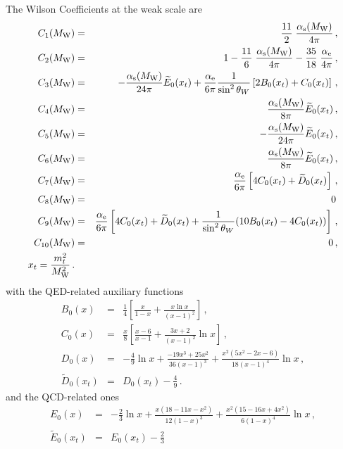 The Wilson Coefficients at the weak scale are
\begin{eqnarray}
C_1(M_{\mathrm W}) &=&     \frac{11}{2} \; \frac{\alpha_{\mathrm s}(M_{\mathrm W})}{4\pi} \, ,
\label{eq:CMw1} \\
C_2(M_{\mathrm W}) &=& 1 - \frac{11}{6} \; \frac{\alpha_{\mathrm s}(M_{\mathrm W})}{4\pi}
               - \frac{35}{18} \; \frac{\alpha_{\mathrm e}}{4\pi} \, ,
\label{eq:CMw2} \\
C_3(M_{\mathrm W}) &=& -\frac{\alpha_{\mathrm s}(M_{\mathrm W})}{24\pi} \widetilde{E}_0(x_t)
             +\frac{\alpha_{\mathrm e}}{6\pi} \frac{1}{\sin^2\theta_W}
             \left[ 2 B_0(x_t) + C_0(x_t) \right] \, , 
\label{eq:CMw3} \\
C_4(M_{\mathrm W}) &=& \frac{\alpha_{\mathrm s}(M_{\mathrm W})}{8\pi} \widetilde{E}_0(x_t) \, ,
\label{eq:CMw4} \\
C_5(M_{\mathrm W}) &=& -\frac{\alpha_{\mathrm s}(M_{\mathrm W})}{24\pi} \widetilde{E}_0(x_t) \, ,
\label{eq:CMw5} \\
C_6(M_{\mathrm W}) &=& \frac{\alpha_{\mathrm s}(M_{\mathrm W})}{8\pi} \widetilde{E}_0(x_t) \, ,
\label{eq:CMw6} \\
C_7(M_{\mathrm W}) &=& \frac{\alpha_{\mathrm e}}{6\pi} \left[ 4 C_0(x_t) + \widetilde{D}_0(x_t)
\right]\, ,
\label{eq:CMw7} \\
C_8(M_{\mathrm W}) &=& 0 \, 
\label{eq:CMw8} \\
C_9(M_{\mathrm W}) &=& \frac{\alpha_{\mathrm e}}{6\pi} \left[ 4 C_0(x_t) + \widetilde{D}_0(x_t) +
             \frac{1}{\sin^2\theta_W} (10 B_0(x_t) - 4 C_0(x_t)) \right] \, ,
\label{eq:CMw9} \\
C_{10}(M_{\mathrm W}) &=& 0 \, ,
\label{eq:CMw10} \\
x_t = \frac{m_t^2}{M_{\mathrm W}^2} \, .
\label{eq:xt}
\end{eqnarray}
with the QED-related auxiliary functions 
\begin{eqnarray}
B_0(x) &=& \frac{1}{4} \left[ \frac{x}{1-x} + \frac{x \ln x}{(x-1)^2}
\right]\, , \label{eq:Bxt} \\
C_0(x) &=& \frac{x}{8} \left[ \frac{x-6}{x-1} + \frac{3 x + 2}{(x-1)^2}
\ln x \right]\, ,
\label{eq:Cxt} \\
D_0(x) &=& -\frac{4}{9} \ln x + \frac{-19 x^3 + 25 x^2}{36 (x-1)^3} +
         \frac{x^2 (5 x^2 - 2 x - 6)}{18 (x-1)^4} \ln x \, ,
\label{eq:Dxt} \\
\widetilde{D}_0(x_t) &=& D_0(x_t) - \frac{4}{9} \, .
\label{eq:Dxttilde} 
\end{eqnarray}
and the QCD-related ones
\begin{eqnarray}
E_0(x) &=& -\frac{2}{3} \ln x + \frac{x (18 -11 x - x^2)}{12 (1-x)^3} +
          \frac{x^2 (15 - 16 x  + 4 x^2)}{6 (1-x)^4} \ln x \, ,
\label{eq:Ext} \\
\widetilde{E}_0(x_t) &=& E_0(x_t) - \frac{2}{3}
\label{eq:Exttilde}
\end{eqnarray}

